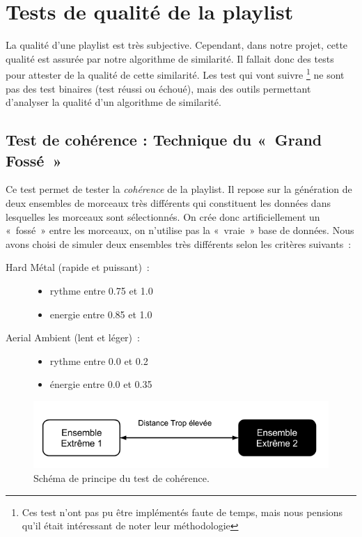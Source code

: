 \section{Tests de qualité de la playlist}
\label{tests:qualite}


La qualité d'une playlist est très subjective. Cependant, dans notre projet, 
cette qualité est assurée par notre algorithme de similarité. Il fallait donc 
des tests pour attester de la qualité de cette similarité. Les test qui vont 
suivre \footnote{Ces test n'ont pas pu être implémentés faute de temps, mais 
nous pensions qu'il était intéressant de noter leur méthodologie} ne sont pas 
des test binaires (test réussi ou échoué), mais des outils permettant 
d'analyser la qualité d'un algorithme de similarité.

\subsection{Test de cohérence : Technique du «~Grand Fossé~»}
\label{tests:qualite:coherence-fosse}

Ce test permet de tester la \emph{cohérence} de la playlist. Il repose sur la
génération de deux ensembles de morceaux très différents qui constituent les
données dans lesquelles les morceaux sont sélectionnés. On crée donc
artificiellement un «~fossé~» entre les morceaux, on n'utilise pas la
«~vraie~» base de données. Nous avons choisi de simuler deux ensembles très
différents selon les critères suivants~:

\begin{description}

\item[Hard Métal (rapide et puissant)~:] \hfill
\begin{itemize}
  \item rythme entre 0.75 et 1.0
  \item energie entre 0.85 et 1.0
\end{itemize}

\item[Aerial Ambient (lent et léger)~:] \hfill
\begin{itemize}
  \item rythme entre 0.0 et 0.2
  \item énergie entre 0.0 et 0.35
\end{itemize}

\end{description}

\begin{figure}[H]
\includegraphics[width=\textwidth]{data/tests/test-coherence-fosse.png}
\caption{Schéma de principe du test de cohérence.}
\end{figure}

